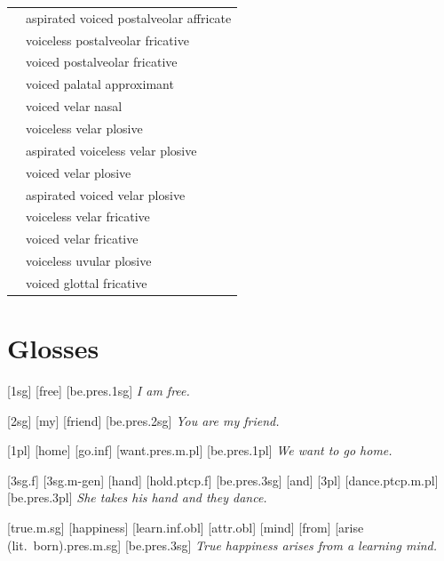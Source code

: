 \documentclass[12pt]{article}
\begin{document}
\begin{xltabular}{\textwidth}{lL}
   & aspirated voiced postalveolar affricate \\
   & voiceless postalveolar fricative \\
   & voiced postalveolar fricative \\
   & voiced palatal approximant \\
   & voiced velar nasal \\
   & voiceless velar plosive \\
   & aspirated voiceless velar plosive \\
   & voiced velar plosive \\
   & aspirated voiced velar plosive \\
   & voiceless velar fricative \\
   & voiced velar fricative \\
   & voiceless uvular plosive \\
  \ipa{\texthth} & voiced glottal fricative \\
\end{xltabular}

\newpage\section{Glosses}

\ex[lingstyle=custom_nlevel]
\begingl
{}[{\sc 1sg}]
[free]
[be.{\sc pres.1sg}]
\glft \textit{I am free.}
\endgl
\xe

\ex[lingstyle=custom_nlevel]
\begingl
{}[{\sc 2sg}]
[my]
[friend]
[be.{\sc pres.2sg}]
\glft \textit{You are my friend.}
\endgl
\xe

\ex[lingstyle=custom_nlevel]
\begingl
{}[{\sc 1pl}]
[home]
[go.{\sc inf}]
[want.{\sc pres.m.pl}]
[be.{\sc pres.1pl}]
\glft \textit{We want to go home.}
\endgl
\xe

\ex[lingstyle=custom_nlevel]
\begingl
{}[{\sc 3sg.f}]
[{\sc 3sg.m}-{\sc gen}]
[hand]
[hold.{\sc ptcp.f}]
[be.{\sc pres.3sg}]
[and]
[{\sc 3pl}]
[dance.{\sc ptcp.m.pl}]
[be.{\sc pres.3pl}]
\glft \textit{She takes his hand and they dance.}
\endgl
\xe

\ex[lingstyle=custom_nlevel]
\begingl
{}[true.{\sc m.sg}]
[happiness]
[learn.{\sc inf.obl}]
[{\sc attr.obl}]
[mind]
[from]
[arise (lit.\ born).{\sc pres.m.sg}]
[be.{\sc pres.3sg}]
\glft \textit{True happiness arises from a learning mind.}
\endgl
\xe
\end{document}
